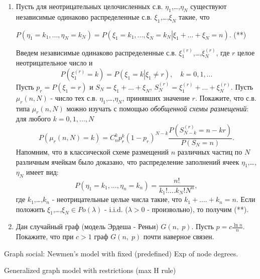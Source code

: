 \begin{problem}
$ $

\begin{enumerate}
\item  Пусть для неотрицательных целочисленных с.в. $\eta _1 
$,{\ldots},$\eta _N $ существуют независимые одинаково распределенные с.в. 
$\xi _1 $,{\ldots},$\xi _N $ такие, что

$P\left( {\eta _1 =k_1 ,...,\eta _N =k_N } \right)=P\left( {\left. {\xi _1 
=k_1 ,...,\xi _N =k_N } \right|\xi _1 +...+\xi _N =n} \right).$ (**)

Введем независимые одинаково распределенные с.в. $\xi _1^{\left( r \right)} 
$,{\ldots},$\xi _N^{\left( r \right)} $, где $r$ целое неотрицательное число 
и
\[
P\left( {\xi _1^{\left( r \right)} =k} \right)=P\left( {\left. {\xi _1 =k} 
\right|\xi _1 \ne r} \right),
\quad
k=0,1,...
\]
Пусть $p_r =P\left( {\xi _1 =r} \right)$ и $S_N =\xi _1 +...+\xi _N $, 
$S_N^{\left( r \right)} =\xi _1^{\left( r \right)} +...+\xi _N^{\left( r 
\right)} $. Пусть $\mu _r \left( {n,N} \right)$ - число тех с.в. $\eta _1 
$,{\ldots},$\eta _N $, принявших значение $r$. Покажите, что с.в. типа $\mu 
_r \left( {n,N} \right)$ можно изучать с помощью \textit{обобщенной схемы размещений}: для любого $k=0,1,...,N$
\[
P\left( {\mu _r \left( {n,N} \right)=k} \right)=C_n^k p_r^k \left( {1-p_r } 
\right)^{N-k}\frac{P\left( {S_{N-k}^{\left( r \right)} =n-kr} 
\right)}{P\left( {S_N =n} \right)}.
\]
Напомним, что в классической схеме размещений $n$ различных частиц по $N$ 
различным ячейкам было доказано, что распределение заполнений ячеек $\eta _1 
$,{\ldots},$\eta _N $ имеет вид:
\[
P\left( {\eta _1 =k_1 ,...,\eta _n =k_n } \right)=\frac{n!}{k_1 !....k_N 
!N^n},
\]
где $k_1 $,{\ldots},$k_n $ - неотрицательные целые числа такие, что $k_1 
+....+k_n =n$. Если положить $\xi _1 $,{\ldots},$\xi _N \in Po\left( \lambda 
\right)$ - i.i.d. ($\lambda >0$ - произвольно), то получим (**).

\item Дан случайный граф (модель Эрдеша - Реньи) $G\left( {n,\;p} \right)$. Пусть 
$p=c\frac{\ln n}{n}$. Покажите, что при $c>1$ граф $G\left( {n,\;p} \right)$ 
почти наверное связен.


\end{enumerate}
\end{problem}

\begin{problem}
Graph social: Newmen's model with fixed (predefined) Exp of node degrees.
\end{problem}

\begin{problem}
Generalized graph model with restrictions (max H rule) 
\end{problem}